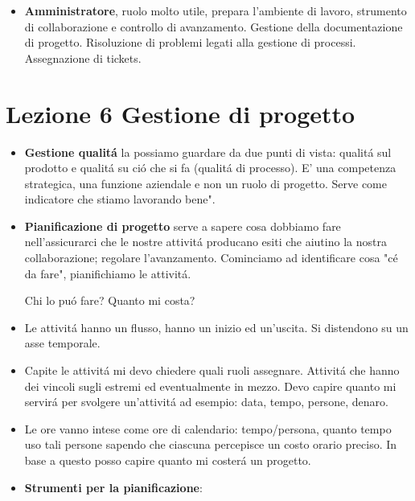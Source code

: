 \documentclass[a4paper,10pt] {article}
\begin{document}
\begin{itemize}
\begin{itemize}
\begin{itemize}
	\item \textbf{Amministratore}, ruolo molto utile, prepara l'ambiente di 
	lavoro, strumento di collaborazione e controllo di avanzamento. Gestione 
	della documentazione di progetto. 
	Risoluzione di problemi legati alla gestione di processi. Assegnazione di 
	tickets.
	\end{itemize}

\end{itemize}

\section{Lezione 6 Gestione di progetto}
\begin{itemize}

\item \textbf{Gestione qualit\'a} la possiamo guardare da due punti di vista: 
qualit\'a sul prodotto e qualit\'a su ci\'o che si fa (qualit\'a di processo). 
E' una competenza strategica, una funzione aziendale e non un ruolo di progetto.
Serve come indicatore che stiamo lavorando bene". 


\item \textbf{Pianificazione di progetto} serve a sapere cosa dobbiamo fare 
nell'assicurarci che le nostre attivit\'a producano esiti che aiutino la nostra 
collaborazione; regolare l'avanzamento. 
Cominciamo ad identificare cosa "c\'e da fare", pianifichiamo le attivit\'a.

Chi lo pu\'o fare? 
Quanto mi costa? 

\item Le attivit\'a hanno un 
flusso, hanno un inizio ed un'uscita. Si 
distendono su un asse temporale.

\item Capite le attivit\'a mi devo chiedere quali ruoli assegnare. Attivit\'a 
che hanno dei vincoli sugli estremi ed eventualmente in mezzo. Devo capire 
quanto mi servir\'a per svolgere un'attivit\'a ad esempio: data,
tempo, persone, denaro.

\item Le ore vanno intese come ore di calendario: 
tempo/persona, quanto tempo uso tali persone sapendo che ciascuna percepisce un 
costo orario preciso. In base a questo posso capire quanto mi coster\'a un 
progetto.

\item \textbf{Strumenti per la pianificazione}:
\begin{itemize}


\end{itemize}
\end{itemize}
\end{itemize}
\end{document}
